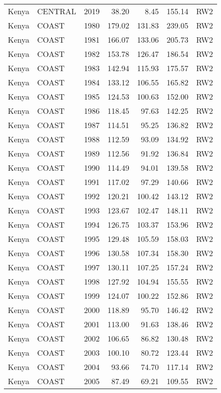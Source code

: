 \begin{longtable}{lllrrrl}
  Kenya & CENTRAL & 2019 & 38.20 & 8.45 & 155.14 & RW2 \\ 
  Kenya & COAST & 1980 & 179.02 & 131.83 & 239.05 & RW2 \\ 
  Kenya & COAST & 1981 & 166.07 & 133.06 & 205.73 & RW2 \\ 
  Kenya & COAST & 1982 & 153.78 & 126.47 & 186.54 & RW2 \\ 
  Kenya & COAST & 1983 & 142.94 & 115.93 & 175.57 & RW2 \\ 
  Kenya & COAST & 1984 & 133.12 & 106.55 & 165.82 & RW2 \\ 
  Kenya & COAST & 1985 & 124.53 & 100.63 & 152.00 & RW2 \\ 
  Kenya & COAST & 1986 & 118.45 & 97.63 & 142.25 & RW2 \\ 
  Kenya & COAST & 1987 & 114.51 & 95.25 & 136.82 & RW2 \\ 
  Kenya & COAST & 1988 & 112.59 & 93.09 & 134.92 & RW2 \\ 
  Kenya & COAST & 1989 & 112.56 & 91.92 & 136.84 & RW2 \\ 
  Kenya & COAST & 1990 & 114.49 & 94.01 & 139.58 & RW2 \\ 
  Kenya & COAST & 1991 & 117.02 & 97.29 & 140.66 & RW2 \\ 
  Kenya & COAST & 1992 & 120.21 & 100.42 & 143.12 & RW2 \\ 
  Kenya & COAST & 1993 & 123.67 & 102.47 & 148.11 & RW2 \\ 
  Kenya & COAST & 1994 & 126.75 & 103.37 & 153.96 & RW2 \\ 
  Kenya & COAST & 1995 & 129.48 & 105.59 & 158.03 & RW2 \\ 
  Kenya & COAST & 1996 & 130.58 & 107.34 & 158.30 & RW2 \\ 
  Kenya & COAST & 1997 & 130.11 & 107.25 & 157.24 & RW2 \\ 
  Kenya & COAST & 1998 & 127.92 & 104.94 & 155.55 & RW2 \\ 
  Kenya & COAST & 1999 & 124.07 & 100.22 & 152.86 & RW2 \\ 
  Kenya & COAST & 2000 & 118.89 & 95.70 & 146.42 & RW2 \\ 
  Kenya & COAST & 2001 & 113.00 & 91.63 & 138.46 & RW2 \\ 
  Kenya & COAST & 2002 & 106.65 & 86.82 & 130.48 & RW2 \\ 
  Kenya & COAST & 2003 & 100.10 & 80.72 & 123.44 & RW2 \\ 
  Kenya & COAST & 2004 & 93.66 & 74.70 & 117.14 & RW2 \\ 
  Kenya & COAST & 2005 & 87.49 & 69.21 & 109.55 & RW2 \\ 

\end{longtable}
